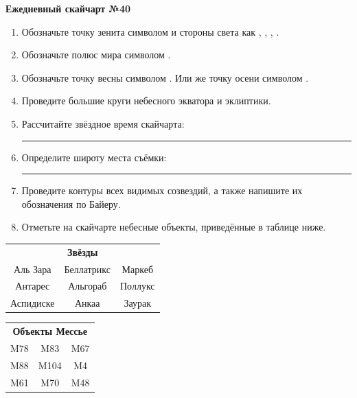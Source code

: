 \documentclass{./SAS-class-skygen}
\begin{document}
    
    
    
	\begin{center}
		\large\textbf{Ежедневный скайчарт №40}
	\end{center}

	\begin{enumerate}
		\item Обозначьте точку зенита символом  и стороны света как , , , .
		\item Обозначьте полюс мира символом .
		\item Обозначьте точку весны символом \Aries. Или же точку осени символом \Libra.
		\item Проведите большие круги небесного экватора и эклиптики.
		\item Рассчитайте звёздное время скайчарта: \rule{2cm}{0.4pt}
		\item Определите широту места съёмки: \rule{2cm}{0.4pt}
		\item Проведите контуры всех видимых созвездий, а также напишите их обозначения по Байеру.
		\item Отметьте на скайчарте небесные объекты, приведённые в таблице ниже.
	\end{enumerate}
	
    \vspace{0.5cm}

    \begin{table}[h!]
    \centering
    \begin{tabular}{ccc}
    \multicolumn{3}{c}{\textbf{Звёзды}} \\ Аль Зара & Беллатрикс & Маркеб \\
Антарес & Альгораб & Поллукс \\
Аспидиске & Анкаа & Заурак \\

\end{tabular}
    \hfill
    \begin{tabular}{ccc}
    \multicolumn{3}{c}{\textbf{Объекты Мессье}} \\ M78 & M83 & M67 \\
M88 & M104 & M4 \\
M61 & M70 & M48 \\

\end{tabular}
    \end{table}
	
\end{document}
